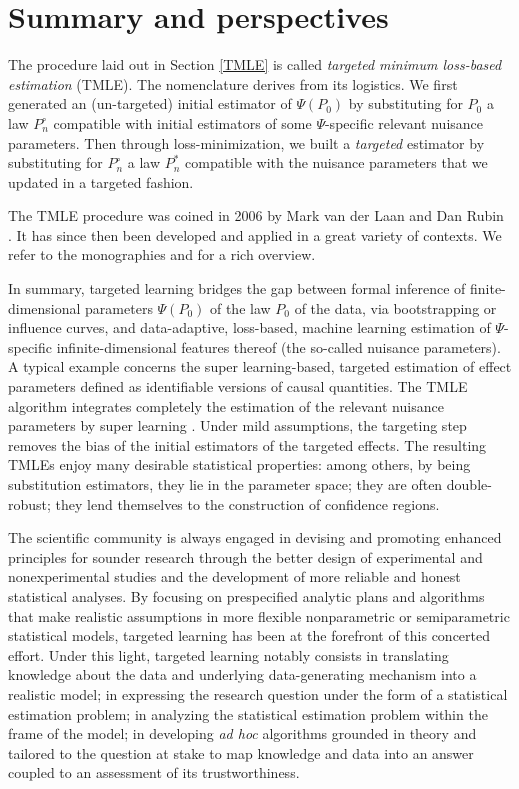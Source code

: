 \documentclass[11pt,openright,twoside]{book}
\newcommand{\Phat}{P^{\circ}}
\theoremstyle{definition}
\theoremstyle{definition}
\theoremstyle{definition}
\theoremstyle{remark}
\begin{document}
\hypertarget{summary-and-perspectives}{%
\section{Summary and perspectives}\label{summary-and-perspectives}}

The procedure laid out in Section \ref{TMLE} is called \emph{targeted minimum
loss-based estimation} (TMLE). The nomenclature derives from its logistics.
We first generated an (un-targeted) initial estimator of \(\Psi(P_0)\) by
substituting for \(P_{0}\) a law \(\Phat_{n}\) compatible with initial estimators
of some \(\Psi\)-specific relevant nuisance parameters. Then through
loss-minimization, we built a \emph{targeted} estimator by substituting for
\(\Phat_{n}\) a law \(P_{n}^{*}\) compatible with the nuisance parameters that we
updated in a targeted fashion.

The TMLE procedure was coined in 2006 by Mark van der Laan and Dan Rubin
\citep{TMLE06}. It has since then been developed and applied in a great variety of
contexts. We refer to the monographies \citep{TMLEbook11} and \citep{TMLEbook18} for a
rich overview.

In summary, targeted learning bridges the gap between formal inference of
finite-dimensional parameters \(\Psi(P_{0})\) of the law \(P_{0}\) of the data,
via bootstrapping or influence curves, and data-adaptive, loss-based, machine
learning estimation of \(\Psi\)-specific infinite-dimensional features thereof
(the so-called nuisance parameters). A typical example concerns the super
learning-based, targeted estimation of effect parameters defined as
identifiable versions of causal quantities. The TMLE algorithm integrates
completely the estimation of the relevant nuisance parameters by super
learning \citep{SL07}. Under mild assumptions, the targeting step removes the bias
of the initial estimators of the targeted effects. The resulting TMLEs enjoy
many desirable statistical properties: among others, by being substitution
estimators, they lie in the parameter space; they are often double-robust;
they lend themselves to the construction of confidence regions.

The scientific community is always engaged in devising and promoting enhanced
principles for sounder research through the better design of experimental and
nonexperimental studies and the development of more reliable and honest
statistical analyses. By focusing on prespecified analytic plans and
algorithms that make realistic assumptions in more flexible nonparametric or
semiparametric statistical models, targeted learning has been at the forefront of
this concerted effort. Under this light, targeted learning notably consists in
translating knowledge about the data and underlying data-generating mechanism
into a realistic model; in expressing the research question under the form of
a statistical estimation problem; in analyzing the statistical estimation
problem within the frame of the model; in developing \emph{ad hoc} algorithms
grounded in theory and tailored to the question at stake to map knowledge and
data into an answer coupled to an assessment of its trustworthiness.
\end{document}
